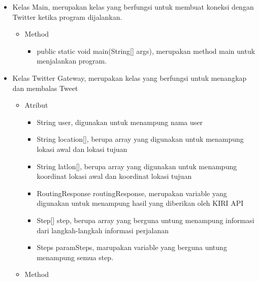 \begin{itemize}
		\item Kelas Main, merupakan kelas yang berfungsi untuk membuat koneksi dengan Twitter ketika program dijalankan.
		
				\begin{itemize}
							\item Method
							
									\begin{itemize}
												\item public static void main(String[] args), merupakan method main untuk menjalankan program.
										
									\end{itemize}
				\end{itemize}
		
		\item Kelas Twitter Gateway, merupakan kelas yang berfungsi untuk menangkap dan membalas Tweet
		
		
				\begin{itemize}
							\item Atribut
							
							
									\begin{itemize}
												\item String user, digunakan untuk menampung nama user
												\item String location[], berupa array yang digunakan untuk menampung lokasi awal dan lokasi tujuan
												\item String latlon[], berupa array yang digunakan untuk menampung koordinat lokasi awal dan koordinat lokasi tujuan
												\item RoutingResponse routingResponse, merupakan variable yang digunakan untuk menampung hasil yang diberikan oleh KIRI API
												\item Step[] step, berupa array yang berguna untung menampung informasi dari langkah-langkah informasi perjalanan
												\item Steps paramSteps, marupakan variable yang berguna untung menampung semua step.
									\end{itemize}
							
							\item Method
							

\end{itemize}
\end{itemize}
